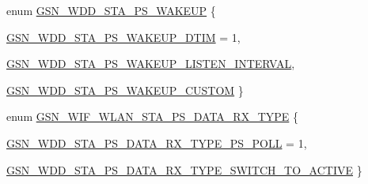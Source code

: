 \begin{DoxyCompactItemize}
enum \hyperlink{a00603_a6267ebdc154297cf5ca79d52aaa5e7ee}{GSN\_\-WDD\_\-STA\_\-PS\_\-WAKEUP} \{ \par
\hyperlink{a00603_a6267ebdc154297cf5ca79d52aaa5e7eea023f317a847bea48735e2f76e70a688d}{GSN\_\-WDD\_\-STA\_\-PS\_\-WAKEUP\_\-DTIM} = 1, 
\par
\hyperlink{a00603_a6267ebdc154297cf5ca79d52aaa5e7eea272f27c0e627a2c1ec808c7182f18a54}{GSN\_\-WDD\_\-STA\_\-PS\_\-WAKEUP\_\-LISTEN\_\-INTERVAL}, 
\par
\hyperlink{a00603_a6267ebdc154297cf5ca79d52aaa5e7eea4755b6dd01d2aad9b836dc931c004459}{GSN\_\-WDD\_\-STA\_\-PS\_\-WAKEUP\_\-CUSTOM}
 \}
\item 
enum \hyperlink{a00603_a3b2419b27de31e09c69e0b3c17dde07d}{GSN\_\-WIF\_\-WLAN\_\-STA\_\-PS\_\-DATA\_\-RX\_\-TYPE} \{ \par
\hyperlink{a00603_a3b2419b27de31e09c69e0b3c17dde07dabc73090ec594d1e1f957e0e536cb97eb}{GSN\_\-WDD\_\-STA\_\-PS\_\-DATA\_\-RX\_\-TYPE\_\-PS\_\-POLL} = 1, 
\par
\hyperlink{a00603_a3b2419b27de31e09c69e0b3c17dde07dac3d2d18c9d2d55c01862536e461f2cf3}{GSN\_\-WDD\_\-STA\_\-PS\_\-DATA\_\-RX\_\-TYPE\_\-SWITCH\_\-TO\_\-ACTIVE}
 \}
\end{DoxyCompactItemize}
